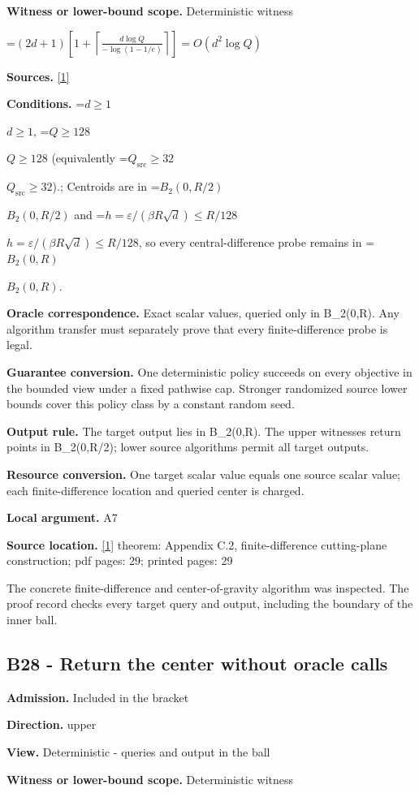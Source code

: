 \documentclass[10pt,a4paper]{article}
\newcommand{\AtlasMath}[1]{\par\begingroup\centering\setbox0=\hbox{$\displaystyle #1$}\ifdim\wd0>1.4\linewidth\typeout{ATLAS WIDE FORMULA: \the\wd0}\fi\ifdim\wd0>\linewidth\resizebox{\linewidth}{!}{\box0}\else\box0\fi\par\endgroup}
\newcommand{\AtlasInlineMath}[1]{\begingroup\setbox0=\hbox{$#1$}\ifdim\wd0>.4\linewidth\endgroup\AtlasMath{#1}\else\endgroup$#1$\fi}
\begin{document}
\textbf{Witness or lower-bound scope.} Deterministic witness

\AtlasMath{(2d+1)\left[1+\left\lceil\frac{d\log Q}{-\log(1-1/e)}\right\rceil\right]=O(d^2\log Q)}
\textbf{Sources.} \href{https://arxiv.org/html/2610.00345v1}{[1]}

\textbf{Conditions.} \AtlasInlineMath{d\ge1}, \AtlasInlineMath{Q\ge128} (equivalently \AtlasInlineMath{Q_{\mathrm{src}}\ge32}).; Centroids are in \AtlasInlineMath{B_2(0,R/2)} and \AtlasInlineMath{h=\varepsilon/(\beta R\sqrt d)\le R/128}, so every central-difference probe remains in \AtlasInlineMath{B_2(0,R)}.

\textbf{Oracle correspondence.} Exact scalar values, queried only in B\_2(0,R). Any algorithm transfer must separately prove that every finite-difference probe is legal.

\textbf{Guarantee conversion.} One deterministic policy succeeds on every objective in the bounded view under a fixed pathwise cap. Stronger randomized source lower bounds cover this policy class by a constant random seed.

\textbf{Output rule.} The target output lies in B\_2(0,R). The upper witnesses return points in B\_2(0,R/2); lower source algorithms permit all target outputs.

\textbf{Resource conversion.} One target scalar value equals one source scalar value; each finite-difference location and queried center is charged.

\textbf{Local argument.} A7

\textbf{Source location.} \href{https://arxiv.org/html/2610.00345v1}{[1]} theorem: Appendix C.2, finite-difference cutting-plane construction; pdf pages: 29; printed pages: 29

The concrete finite-difference and center-of-gravity algorithm was inspected. The proof record checks every target query and output, including the boundary of the inner ball.

\subsection{B28 - Return the center without oracle calls}
\textbf{Admission.} Included in the bracket

\textbf{Direction.} upper

\textbf{View.} Deterministic - queries and output in the ball

\textbf{Witness or lower-bound scope.} Deterministic witness
\end{document}
